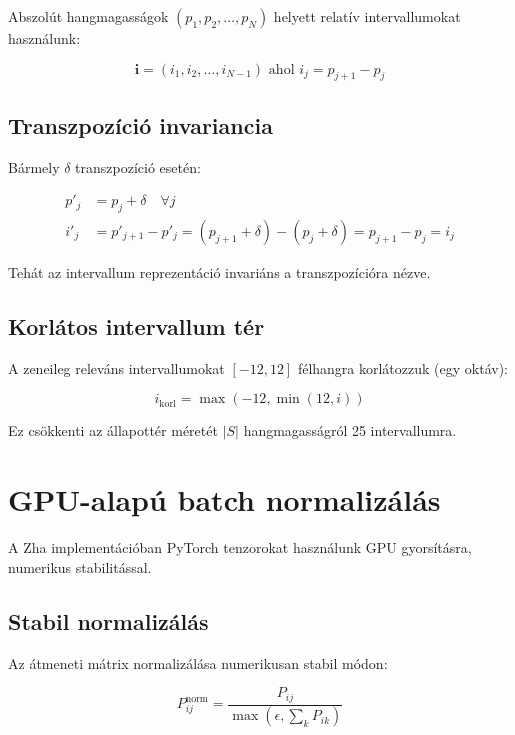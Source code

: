 Abszolút hangmagasságok $(p_1, p_2, \ldots, p_N)$ helyett relatív intervallumokat használunk:

\begin{equation}
\mathbf{i} = (i_1, i_2, \ldots, i_{N-1}) \text{ ahol } i_j = p_{j+1} - p_j
\end{equation}

\subsection{Transzpozíció invariancia}

Bármely $\delta$ transzpozíció esetén:

\begin{align}
p'_j &= p_j + \delta \quad \forall j \\
i'_j &= p'_{j+1} - p'_j = (p_{j+1} + \delta) - (p_j + \delta) = p_{j+1} - p_j = i_j
\end{align}

Tehát az intervallum reprezentáció invariáns a transzpozícióra nézve.

\subsection{Korlátos intervallum tér}

A zeneileg releváns intervallumokat $[-12, 12]$ félhangra korlátozzuk (egy oktáv):

\begin{equation}
i_{\text{korl}} = \max(-12, \min(12, i))
\end{equation}

Ez csökkenti az állapottér méretét $|S|$ hangmagasságról 25 intervallumra.

\section{GPU-alapú batch normalizálás}
\label{proof:gpu_normalization}

A Zha implementációban PyTorch tenzorokat használunk GPU gyorsításra, numerikus stabilitással.

\subsection{Stabil normalizálás}

Az átmeneti mátrix normalizálása numerikusan stabil módon:

\begin{equation}
P_{ij}^{\text{norm}} = \frac{P_{ij}}{\max(\epsilon, \sum_k P_{ik})}
\end{equation}

